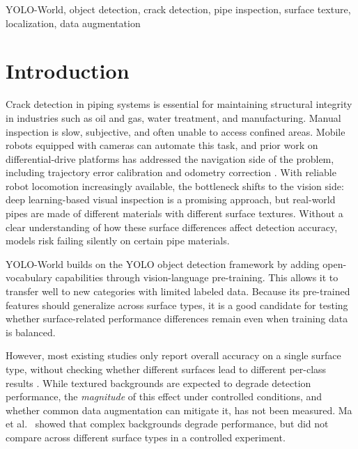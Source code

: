 \documentclass[conference]{IEEEtran}
\begin{document}
\begin{IEEEkeywords}
YOLO-World, object detection, crack detection, pipe inspection, surface texture, localization, data augmentation
\end{IEEEkeywords}

\section{Introduction}

Crack detection in piping systems is essential for maintaining structural integrity in industries such as oil and gas, water treatment, and manufacturing. Manual inspection is slow, subjective, and often unable to access confined areas. Mobile robots equipped with cameras can automate this task, and prior work on differential-drive platforms has addressed the navigation side of the problem, including trajectory error calibration \cite{dimalanta2022trajectory,dimalanta2023bluetooth} and odometry correction \cite{pangaliman2022odometry}. With reliable robot locomotion increasingly available, the bottleneck shifts to the vision side: deep learning-based visual inspection is a promising approach, but real-world pipes are made of different materials with different surface textures. Without a clear understanding of how these surface differences affect detection accuracy, models risk failing silently on certain pipe materials.

YOLO-World \cite{cheng2024yoloworld} builds on the YOLO \cite{redmon2016yolo} object detection framework by adding open-vocabulary capabilities through vision-language pre-training. This allows it to transfer well to new categories with limited labeled data. Because its pre-trained features should generalize across surface types, it is a good candidate for testing whether surface-related performance differences remain even when training data is balanced.

However, most existing studies only report overall accuracy on a single surface type, without checking whether different surfaces lead to different per-class results \cite{hsieh2020crack,liu2023survey,cha2017deep,li2024sewer}. While textured backgrounds are expected to degrade detection performance, the \textit{magnitude} of this effect under controlled conditions, and whether common data augmentation can mitigate it, has not been measured. Ma et al.\ \cite{li2024texmsyolo} showed that complex backgrounds degrade performance, but did not compare across different surface types in a controlled experiment.
\end{document}
